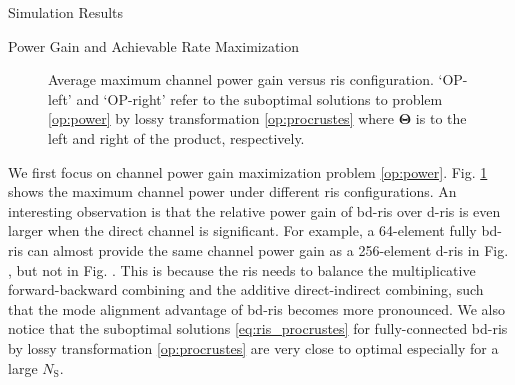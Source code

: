 \documentclass[journal]{IEEEtran}
\begin{document}
\begin{section}{Simulation Results}
 \begin{subsection}{Power Gain and Achievable Rate Maximization}
	 \begin{figure}[!t]
		 \centering
		 \caption{
			 Average maximum channel power gain versus \gls{ris} configuration.
			 `OP-left' and `OP-right' refer to the suboptimal solutions to problem \eqref{op:power} by lossy transformation \eqref{op:procrustes} where $\mathbf{\Theta}$ is to the left and right of the product, respectively.
		 }
		 \label{fg:power_sx}
	 \end{figure}

	 We first focus on channel power gain maximization problem \eqref{op:power}.
	 Fig. \ref{fg:power_sx} shows the maximum channel power under different \gls{ris} configurations.
	 An interesting observation is that the relative power gain of \gls{bd}-\gls{ris} over \gls{d}-\gls{ris} is even larger when the direct channel is significant.
	 For example, a 64-element fully \gls{bd}-\gls{ris} can almost provide the same channel power gain as a 256-element \gls{d}-\gls{ris} in Fig. , but not in Fig. .
	 This is because the \gls{ris} needs to balance the multiplicative forward-backward combining and the additive direct-indirect combining, such that the mode alignment advantage of \gls{bd}-\gls{ris} becomes more pronounced.
	 We also notice that the suboptimal solutions \eqref{eq:ris_procrustes} for fully-connected \gls{bd}-\gls{ris} by lossy transformation \eqref{op:procrustes} are very close to optimal especially for a large $N_\mathrm{S}$.


\end{subsection}
\end{section}
\end{document}
